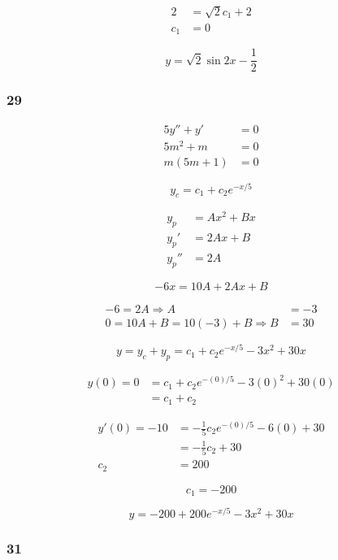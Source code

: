 \documentclass{article}
\begin{document}
\begin{align*}
  2   & = \sqrt{2} c_1 + 2 \\
  c_1 & = 0
\end{align*}

\[y = \sqrt{2} \sin 2x - \frac{1}{2}\]

\subsubsection{29}

\begin{align*}
  5y'' + y'  & = 0 \\
  5m^2 + m   & = 0 \\
  m (5m + 1) & = 0
\end{align*}

\[y_c = c_1 + c_2 e^{-x / 5}\]

\begin{align*}
  y_p   & = Ax^2 + Bx \\
  y_p'  & = 2Ax + B   \\
  y_p'' & = 2A
\end{align*}

\[-6x = 10A + 2Ax + B\]

\begin{align*}
  -6 = 2A \Rightarrow A                   & = -3 \\
  0 = 10A + B = 10 (-3) + B \Rightarrow B & = 30
\end{align*}

\[y = y_c + y_p = c_1 + c_2 e^{-x / 5} - 3x^2 + 30x\]

\begin{align*}
  y(0) = 0 & = c_1 + c_2 e^{-(0) / 5} - 3 (0)^2 + 30 (0) \\
           & = c_1 + c_2
\end{align*}

\begin{align*}
  y'(0) = -10 & = -\frac{1}{5} c_2 e^{-(0) / 5} - 6 (0) + 30 \\
              & = -\frac{1}{5} c_2 + 30                      \\
  c_2         & = 200
\end{align*}

\[c_1 = -200\]

\[y = -200 + 200 e^{-x / 5} - 3x^2 + 30x\]

\subsubsection{31}
\end{document}
